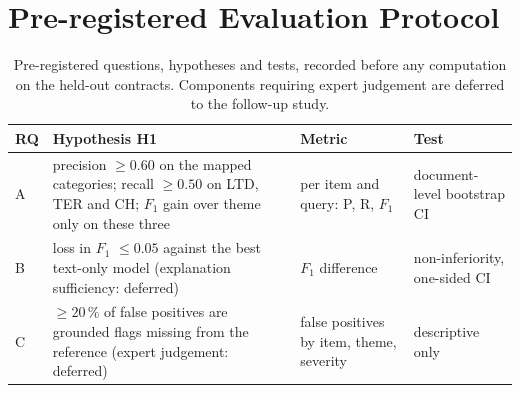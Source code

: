 \section{Pre-registered Evaluation Protocol}
\label{sec:protocol}
\begin{table}[t]
\caption{Pre-registered questions, hypotheses and tests, recorded before any computation on the held-out contracts. Components requiring expert judgement are deferred to the follow-up study.}
\label{tab:rq}
\centering
\footnotesize\setlength{\tabcolsep}{3pt}%
\begin{tabular}{@{}p{0.55cm} p{5.9cm} p{2.3cm} p{2.3cm}@{}}
\toprule
RQ & Hypothesis H1 & Metric & Test \\
\midrule
A & precision $\geq 0.60$ on the mapped categories; recall $\geq 0.50$ on LTD, TER and CH; $F_1$ gain over theme only on these three & per item and query: P, R, $F_1$ & document-level bootstrap CI \\
B & loss in $F_1$ $\leq 0.05$ against the best text-only model (explanation sufficiency: deferred) & $F_1$ difference & non-inferiority, one-sided CI \\
C & $\geq 20\,\%$ of false positives are grounded flags missing from the reference (expert judgement: deferred) & false positives by item, theme, severity & descriptive only \\
\bottomrule
\end{tabular}
\end{table}

